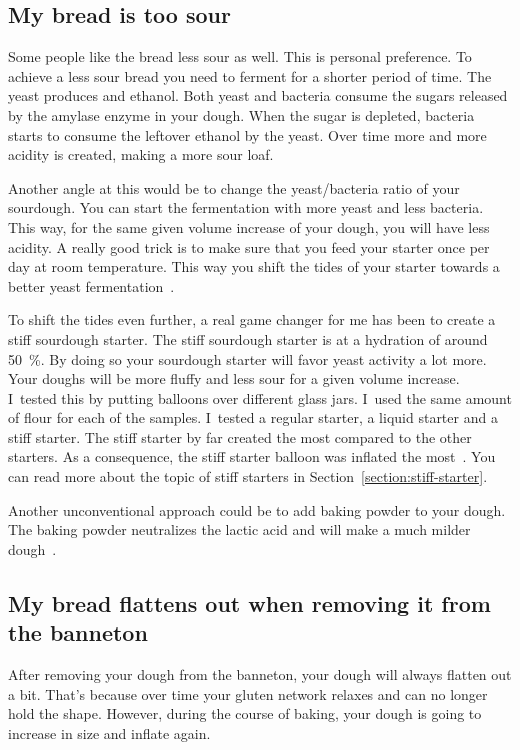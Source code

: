\subsection{My bread is too sour}

Some people like the bread less sour as well. This
is personal preference. To achieve a less sour bread
you need to ferment for a shorter period of time.
The yeast produces  and ethanol. Both yeast and
bacteria consume the sugars released by the amylase enzyme
in your dough. When the sugar is depleted, bacteria starts to
consume the leftover ethanol by the yeast. Over time more
and more acidity is created, making a more sour loaf.

Another angle at this would be to change the yeast/bacteria
ratio of your sourdough. You can start the fermentation with
more yeast and less bacteria. This way, for the same given
volume increase of your dough, you will have less acidity.
A really good trick is to make sure that you feed your starter
once per day at room temperature. This way you shift
the tides of your starter towards a better yeast fermentation~\cite*{more+active+starter}.

To shift the tides even further, a real game changer
for me has been to create a stiff sourdough starter. The
stiff sourdough starter is at a hydration of around \qty{50}{\percent}.
By doing so your sourdough starter will favor yeast
activity a lot more. Your doughs will be more fluffy and less
sour for a given volume increase. I~tested this
by putting balloons over different glass jars. I~used
the same amount of flour for each of the samples.
I~tested a regular starter, a liquid starter and a stiff
starter. The stiff starter by far created the most 
compared to the other starters. As a consequence, the stiff
starter balloon was inflated the most~\cite{stiff+starter}. You can read more
about the topic of stiff starters in Section~\ref{section:stiff-starter}.

Another unconventional approach could be to add baking
powder to your dough. The baking powder neutralizes the
lactic acid and will make a much milder
dough~\cite{baking+powder+reduce-acidity}.

\subsection{My bread flattens out when removing it from the banneton}

After removing your dough from the banneton, your dough will always
flatten out a bit. That's because over time your gluten network
relaxes and can no longer hold the shape. However, during the course
of baking, your dough is going to increase in size and inflate again.

